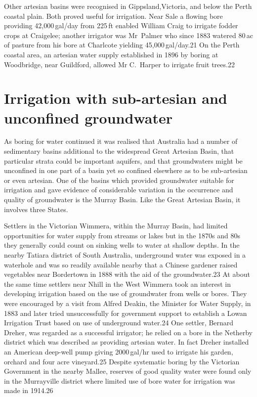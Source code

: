 Other artesian basins were recognised in Gippsland,Victoria, and below
the Perth coastal plain.  Both proved useful for irrigation. Near Sale
a flowing bore providing 42,000\,gal/day from 225\,ft enabled William
Craig to irrigate fodder crops at Craigelee; another irrigator was
Mr~Palmer who since 1883 watered 80\,ac of pasture from his bore at
Charlcote yielding 45,000\,gal/day.21 On the Perth coastal area, an
artesian water supply established in 1896 by boring at Woodbridge,
near Guildford, allowed Mr C.~Harper to irrigate fruit trees.22

\section{Irrigation with sub-artesian and unconfined groundwater}

As boring for water continued it was realised that Australia had a
number of sedimentary basins additional to the widespread Great
Artesian Basin, that particular strata could be important aquifers,
and that groundwaters might be unconfined in one part of a basin yet
so confined elsewhere as to be sub-artesian or even artesian.  One of
the basins which provided groundwater suitable for irrigation and gave
evidence of considerable variation in the occurrence and quality of
groundwater is the Murray Basin.  Like the Great Artesian Basin, it
involves three States.

Settlers in the Victorian Wimmera, within the Murray Basin, had
limited opportunities for water supply from streams or lakes but in
the 1870s and 80s they generally could count on sinking wells to water
at shallow depths.  In the nearby Tatiara district of South Australia,
underground water was exposed in a waterhole and was so readily
available nearby that a Chinese gardener raised vegetables near
Bordertown in 1888 with the aid of the groundwater.23 At about the
same time settlers near Nhill in the West Wimmera took an interest in
developing irrigation based on the use of groundwater from wells or
bores.  They were encouraged by a visit from Alfred Deakin, the
Minister for Water Supply, in 1883 and later tried unsuccessfully for
government support to establish a Lowan Irrigation Trust based on use
of underground water.24 One settler, Bernard Dreher, was regarded as a
successful irrigator; he relied on a bore in the Netherby district
which was described as providing artesian water. In fact Dreher
installed an American deep-well pump giving 2000\,gal/hr used to
irrigate his garden, orchard and four acre vineyard.25 Despite
systematic boring by the Victorian Government in the nearby Mallee,
reserves of good quality water were found only in the Murrayville
district where limited use of bore water for irrigation was made in
1914.26

